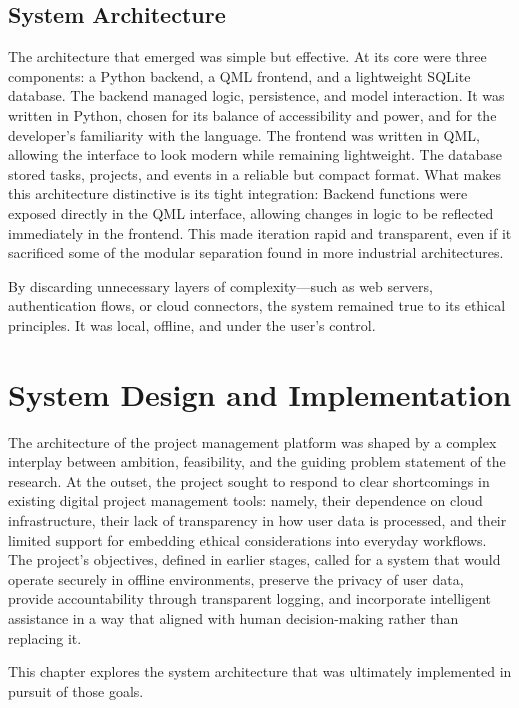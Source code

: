 \documentclass{report}
\begin{document}
\section{System Architecture}

The architecture that emerged was simple but effective. 
At its core were three components: a Python backend, a QML frontend, and a lightweight SQLite database.
The backend managed logic, persistence, and model interaction. 
It was written in Python, chosen for its balance of accessibility and power, and for the developer's familiarity with the language. 
The frontend was written in QML, allowing the interface to look modern while remaining lightweight. 
The database stored tasks, projects, and events in a reliable but compact format.
What makes this architecture distinctive is its tight integration: Backend functions were exposed directly in the QML interface, allowing changes in logic to be reflected immediately in the frontend. 
This made iteration rapid and transparent, even if it sacrificed some of the modular separation found in more industrial architectures.

By discarding unnecessary layers of complexity—such as web servers, authentication flows, or cloud connectors, the system remained true to its ethical principles. 
It was local, offline, and under the user's control.

\chapter{System Design and Implementation}

The architecture of the project management platform was shaped by a complex interplay between ambition, feasibility, and the guiding problem statement of the research. 
At the outset, the project sought to respond to clear shortcomings in existing digital project management tools: namely, their dependence on cloud infrastructure, their lack of transparency in how user data is processed, and their limited support for embedding ethical considerations into everyday workflows. 
The project's objectives, defined in earlier stages, called for a system that would operate securely in offline environments, preserve the privacy of user data, provide accountability through transparent logging, and incorporate intelligent assistance in a way that aligned with human decision-making rather than replacing it.

This chapter explores the system architecture that was ultimately implemented in pursuit of those goals. 
\end{document}

